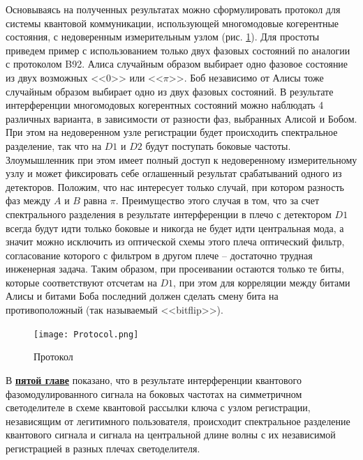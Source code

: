 Основываясь на полученных результатах можно сформулировать протокол для системы квантовой коммуникации, использующей многомодовые когерентные состояния, с недоверенным измерительным узлом (рис. \ref{fig:Protocol}). Для простоты приведем пример с использованием только двух фазовых состояний по аналогии с протоколом B92. Алиса случайным образом выбирает одно фазовое состояние из двух возможных <<$0$>> или <<$\pi$>>. Боб независимо от Алисы тоже случайным образом выбирает одно из двух фазовых состояний. В результате интерференции многомодовых когерентных состояний можно наблюдать 4 различных варианта, в зависимости от разности фаз, выбранных Алисой и Бобом.  При этом на недоверенном узле регистрации будет происходить спектральное разделение, так что на $D1$ и $D2$ будут поступать боковые частоты. Злоумышленник при этом имеет полный доступ к недоверенному измерительному узлу и может фиксировать себе оглашенный результат срабатываний одного из детекторов. Положим, что нас интересует только случай, при котором разность фаз между $A$ и $B$ равна $\pi$. Преимущество этого случая в том, что за счет спектрального разделения в результате интерференции в плечо с детектором $D1$ всегда будут идти только боковые и никогда не будет идти центральная мода, а значит можно исключить из оптической схемы этого плеча оптический фильтр, согласование которого с фильтром в другом плече -- достаточно трудная инженерная задача. Таким образом, при просеивании остаются только те биты, которые соответствуют отсчетам на $D1$, при этом для корреляции между битами Алисы и битами Боба последний должен сделать смену бита на противоположный (так называемый <<bitflip>>).  

\begin{figure}[ht]
 \centering
  \texttt{[image: Protocol.png]}
  \caption{Протокол}
  \label{fig:Protocol}
\end{figure}
 
  В \underline{\textbf{пятой главе}} показано, что в результате интерференции квантового фазомодулированного сигнала на боковых частотах на симметричном светоделителе в схеме квантовой рассылки ключа с узлом регистрации, независящим от легитимного пользователя, происходит спектральное разделение квантового сигнала и сигнала на центральной длине волны с их независимой регистрацией в разных плечах светоделителя. 
  
